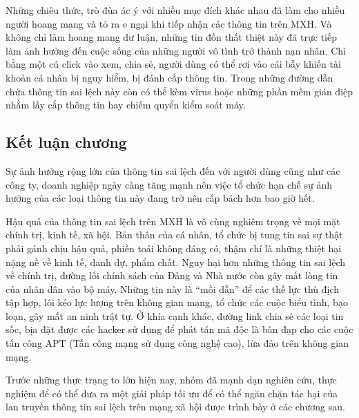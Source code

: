 		Những chiêu thức, trò đùa ác ý với nhiều mục đích khác nhau đã làm cho nhiều người hoang mang và tỏ ra e ngại khi tiếp nhận các thông tin trên MXH. Và không chỉ làm hoang mang dư luận, những tin đồn thất thiệt này đã trực tiếp làm ảnh hưởng đến cuộc sống của những người vô tình trở thành nạn nhân. Chỉ bằng một cú click vào xem, chia sẻ, người dùng có thể rơi vào cái bẫy khiến tài khoản cá nhân bị nguy hiểm, bị đánh cắp thông tin. Trong những đường dẫn chứa thông tin sai lệch này còn có thể kèm virus hoặc những phần mềm gián điệp nhằm lấy cắp thông tin hay chiếm quyển kiểm soát máy.
	\subsection*{Kết luận chương}
	Sự ảnh hưởng rộng lớn của thông tin sai lệch đến với người dùng cũng như các công ty, doanh nghiệp ngày càng tăng mạnh nên việc tổ chức hạn chế sự ảnh hưởng của các loại thông tin này đang trở nên cấp bách hơn bao giờ hết. 
	
	Hậu quả của thông tin sai lệch trên MXH là vô cùng nghiêm trọng về mọi mặt chính trị, kinh tế, xã hội. Bản thân của cá nhân, tổ chức bị tung tin sai sự thật phải gánh chịu hậu quả, phiền toái không đáng có, thậm chí là những thiệt hại nặng nề về kinh tế, danh dự, phẩm chất. Nguy hại hơn những thông tin sai lệch về chính trị, đường lối chính sách của Đảng và Nhà nước còn gây mất lòng tin của nhân dân vào bộ máy. Những tin này là “mồi dẫn” để các thế lực thù địch tập hợp, lôi kéo lực lượng trên không gian mạng, tổ chức các cuộc biểu tình, bạo loạn, gây mất an ninh trật tự. Ở khía cạnh khác, đường link chia sẻ các loại tin sốc, bịa đặt được các hacker sử dụng để phát tán mã độc là bàn đạp cho các cuộc tấn công APT (Tấn công mạng sử dụng công nghệ cao), lừa đảo trên không gian mạng.
	
	Trước những thực trạng to lớn hiện nay, nhóm đã mạnh dạn nghiên cứu, thực nghiệm để có thể đưa ra một giải pháp tối ưu để có thể ngăn chặn tác hại của lan truyền thông tin sai lệch trên mạng xã hội được trình bày ở các chương sau.			